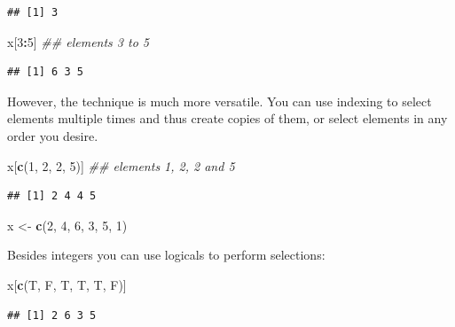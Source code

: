 \documentclass[]{book}
\newenvironment{Shaded}{\begin{snugshade}}{\end{snugshade}}
\newcommand{\CommentTok}[1]{\textcolor[rgb]{0.56,0.35,0.01}{\textit{#1}}}
\newcommand{\DecValTok}[1]{\textcolor[rgb]{0.00,0.00,0.81}{#1}}
\newcommand{\KeywordTok}[1]{\textcolor[rgb]{0.13,0.29,0.53}{\textbf{#1}}}
\newcommand{\NormalTok}[1]{#1}
\newcommand{\OperatorTok}[1]{\textcolor[rgb]{0.81,0.36,0.00}{\textbf{#1}}}
\newcommand{\StringTok}[1]{\textcolor[rgb]{0.31,0.60,0.02}{#1}}
\begin{document}
\begin{verbatim}
## [1] 3
\end{verbatim}

\begin{Shaded}
\begin{Highlighting}[]
\NormalTok{x[}\DecValTok{3}\OperatorTok{:}\DecValTok{5}\NormalTok{] }\CommentTok{## elements 3 to 5}
\end{Highlighting}
\end{Shaded}

\begin{verbatim}
## [1] 6 3 5
\end{verbatim}

However, the technique is much more versatile. You can use indexing to select elements multiple times and thus create copies of them, or select elements in any order you desire.

\begin{Shaded}
\begin{Highlighting}[]
\NormalTok{x[}\KeywordTok{c}\NormalTok{(}\DecValTok{1}\NormalTok{, }\DecValTok{2}\NormalTok{, }\DecValTok{2}\NormalTok{, }\DecValTok{5}\NormalTok{)] }\CommentTok{## elements 1, 2, 2 and 5}
\end{Highlighting}
\end{Shaded}

\begin{verbatim}
## [1] 2 4 4 5
\end{verbatim}

\begin{Shaded}
\begin{Highlighting}[]
\NormalTok{x <-}\StringTok{ }\KeywordTok{c}\NormalTok{(}\DecValTok{2}\NormalTok{, }\DecValTok{4}\NormalTok{, }\DecValTok{6}\NormalTok{, }\DecValTok{3}\NormalTok{, }\DecValTok{5}\NormalTok{, }\DecValTok{1}\NormalTok{)}
\end{Highlighting}
\end{Shaded}

Besides integers you can use logicals to perform selections:

\begin{Shaded}
\begin{Highlighting}[]
\NormalTok{x[}\KeywordTok{c}\NormalTok{(T, F, T, T, T, F)]}
\end{Highlighting}
\end{Shaded}

\begin{verbatim}
## [1] 2 6 3 5
\end{verbatim}
\end{document}
